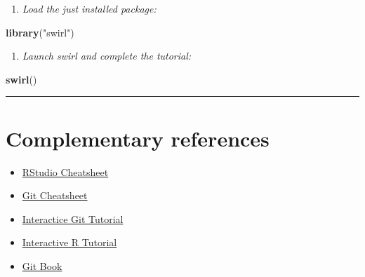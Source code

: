 \documentclass[]{article}
\newenvironment{Shaded}{\begin{snugshade}}{\end{snugshade}}
\newcommand{\KeywordTok}[1]{\textcolor[rgb]{0.13,0.29,0.53}{\textbf{#1}}}
\newcommand{\StringTok}[1]{\textcolor[rgb]{0.31,0.60,0.02}{#1}}
\newcommand{\NormalTok}[1]{#1}
\providecommand{\tightlist}{%
  \setlength{\itemsep}{0pt}\setlength{\parskip}{0pt}}
\begin{document}
\begin{enumerate}
\def\labelenumi{\arabic{enumi}.}
\setcounter{enumi}{1}
\tightlist
\item
  \emph{Load the just installed package:}
\end{enumerate}

\begin{Shaded}
\begin{Highlighting}[]
\KeywordTok{library}\NormalTok{(}\StringTok{"swirl"}\NormalTok{)}
\end{Highlighting}
\end{Shaded}

\begin{enumerate}
\def\labelenumi{\arabic{enumi}.}
\setcounter{enumi}{2}
\tightlist
\item
  \emph{Launch swirl and complete the tutorial:}
\end{enumerate}

\begin{Shaded}
\begin{Highlighting}[]
\KeywordTok{swirl}\NormalTok{()}
\end{Highlighting}
\end{Shaded}

\begin{center}\rule{0.5\linewidth}{\linethickness}\end{center}

\section{Complementary references}\label{complementary-references}

\begin{itemize}
\tightlist
\item
  \href{https://www.rstudio.com/wp-content/uploads/2016/01/rstudio-IDE-cheatsheet.pdf}{RStudio
  Cheatsheet}
\item
  \href{http://files.zeroturnaround.com/pdf/zt_git_cheat_sheet.pdf}{Git
  Cheatsheet}
\item
  \href{https://try.github.io/levels/1/challenges/1}{Interactice Git
  Tutorial}
\item
  \href{http://tryr.codeschool.com/}{Interactive R Tutorial}
\item
  \href{https://git-scm.com/book/en/v2}{Git Book}
\end{itemize}
\end{document}
